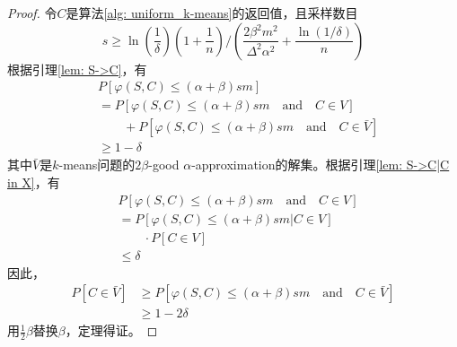 \begin{proof}
    令$C$是算法\ref{alg: uniform_k-means}的返回值，且采样数目
    \begin{equation}
    s \geq \ln(\frac{1}{\delta})(1+\frac{1}{n})/(\frac{2\beta^2 m^2}{\Delta^2 \alpha^2}+\frac{\ln(1/\delta)}{n})
    \end{equation}
    根据引理\ref{lem: S->C}，有
    \begin{align}
        &P[\varphi(S,C) \leq (\alpha + \beta)sm] \\
        &= P[\varphi(S,C) \leq (\alpha + \beta)sm \quad \text{and} \quad C \in V] \\
        & \qquad {} + P[\varphi(S,C) \leq (\alpha + \beta)sm \quad \text{and} \quad C \in \bar{V}] \\
        &\geq 1-\delta
    \end{align}
    其中$\bar{V}$是$k$-means问题的$2\beta$-good $\alpha$-approximation的解集。根据引理\ref{lem: S->C|C in X}，有
    \begin{align}
    &P[\varphi(S,C) \leq (\alpha + \beta)sm \quad \text{and} \quad C \in V] \\
    &= P[\varphi(S,C) \leq (\alpha+\beta)sm | C \in V] \\
    &\qquad {} \cdot P[C \in V] \\
    &\leq \delta
    \end{align}
    因此，
    \begin{align}
    P[C \in \bar{V}] 
    &\geq P[\varphi(S,C) \leq (\alpha + \beta)sm \quad \text{and} \quad C \in \bar{V}] \\
    &\geq 1-2\delta
    \end{align}
    用$\frac{1}{2}\beta$替换$\beta$，定理得证。
\end{proof}

